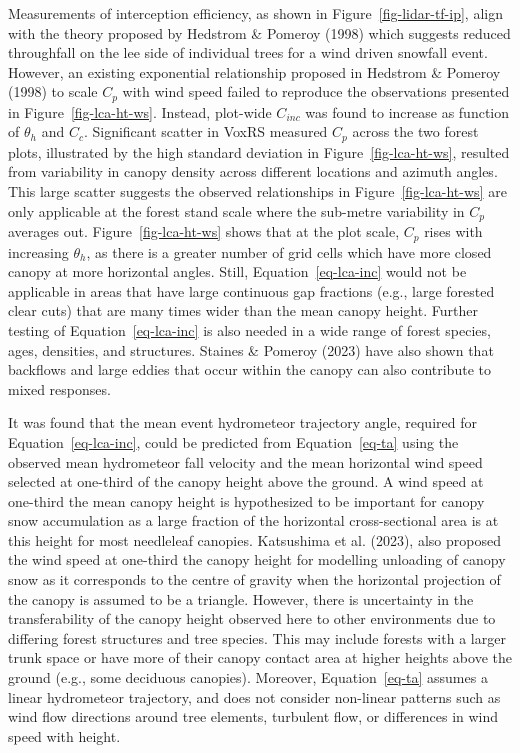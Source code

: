 \documentclass[
  letterpaper,
  DIV=11,
  numbers=noendperiod]{scrartcl}
\begin{document}
Measurements of interception efficiency, as shown in
Figure~\ref{fig-lidar-tf-ip}, align with the theory proposed by Hedstrom
\& Pomeroy (1998) which suggests reduced throughfall on the lee side of
individual trees for a wind driven snowfall event. However, an existing
exponential relationship proposed in Hedstrom \& Pomeroy (1998) to scale
\(C_p\) with wind speed failed to reproduce the observations presented
in Figure~\ref{fig-lca-ht-ws}. Instead, plot-wide \(C_{inc}\) was found
to increase as function of \(\theta_h\) and \(C_c\). Significant scatter
in VoxRS measured \(C_p\) across the two forest plots, illustrated by
the high standard deviation in Figure~\ref{fig-lca-ht-ws}, resulted from
variability in canopy density across different locations and azimuth
angles. This large scatter suggests the observed relationships in
Figure~\ref{fig-lca-ht-ws} are only applicable at the forest stand scale
where the sub-metre variability in \(C_p\) averages out.
Figure~\ref{fig-lca-ht-ws} shows that at the plot scale, \(C_p\) rises
with increasing \(\theta_h\), as there is a greater number of grid cells
which have more closed canopy at more horizontal angles. Still,
Equation~\ref{eq-lca-inc} would not be applicable in areas that have
large continuous gap fractions (e.g., large forested clear cuts) that
are many times wider than the mean canopy height. Further testing of
Equation~\ref{eq-lca-inc} is also needed in a wide range of forest
species, ages, densities, and structures. Staines \& Pomeroy (2023) have
also shown that backflows and large eddies that occur within the canopy
can also contribute to mixed responses.

It was found that the mean event hydrometeor trajectory angle, required
for Equation~\ref{eq-lca-inc}, could be predicted from
Equation~\ref{eq-ta} using the observed mean hydrometeor fall velocity
and the mean horizontal wind speed selected at one-third of the canopy
height above the ground. A wind speed at one-third the mean canopy
height is hypothesized to be important for canopy snow accumulation as a
large fraction of the horizontal cross-sectional area is at this height
for most needleleaf canopies. Katsushima et al. (2023), also proposed
the wind speed at one-third the canopy height for modelling unloading of
canopy snow as it corresponds to the centre of gravity when the
horizontal projection of the canopy is assumed to be a triangle.
However, there is uncertainty in the transferability of the canopy
height observed here to other environments due to differing forest
structures and tree species. This may include forests with a larger
trunk space or have more of their canopy contact area at higher heights
above the ground (e.g., some deciduous canopies). Moreover,
Equation~\ref{eq-ta} assumes a linear hydrometeor trajectory, and does
not consider non-linear patterns such as wind flow directions around
tree elements, turbulent flow, or differences in wind speed with height.
\end{document}
